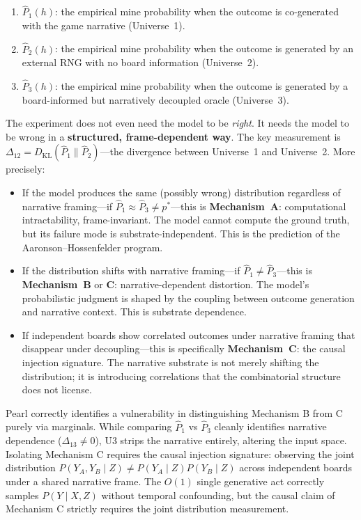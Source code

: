 \documentclass[12pt,a4paper]{article}
\begin{document}
\begin{enumerate}[nosep]
    \item $\hat{P}_1(h)$: the empirical mine probability when the outcome is co-generated with the game narrative (Universe~1).
    \item $\hat{P}_2(h)$: the empirical mine probability when the outcome is generated by an external RNG with no board information (Universe~2).
    \item $\hat{P}_3(h)$: the empirical mine probability when the outcome is generated by a board-informed but narratively decoupled oracle (Universe~3).
\end{enumerate}

The experiment does not even need the model to be \emph{right}. It needs the model to be wrong in a \textbf{structured, frame-dependent way}. The key measurement is $\Delta_{12} = D_\mathrm{KL}(\hat{P}_1 \| \hat{P}_2)$---the divergence between Universe~1 and Universe~2. More precisely:

\begin{itemize}[nosep]
    \item If the model produces the same (possibly wrong) distribution regardless of narrative framing---if $\hat{P}_1 \approx \hat{P}_3 \neq p^*$---this is \textbf{Mechanism~A}: computational intractability, frame-invariant. The model cannot compute the ground truth, but its failure mode is substrate-independent. This is the prediction of the Aaronson--Hossenfelder program.
    \item If the distribution shifts with narrative framing---if $\hat{P}_1 \neq \hat{P}_3$---this is \textbf{Mechanism~B} or \textbf{C}: narrative-dependent distortion. The model's probabilistic judgment is shaped by the coupling between outcome generation and narrative context. This is substrate dependence.
    \item If independent boards show correlated outcomes under narrative framing that disappear under decoupling---this is specifically \textbf{Mechanism~C}: the causal injection signature. The narrative substrate is not merely shifting the distribution; it is introducing correlations that the combinatorial structure does not license.
\end{itemize}

Pearl correctly identifies a vulnerability in distinguishing Mechanism B from C purely via marginals. While comparing $\hat{P}_1$ vs $\hat{P}_3$ cleanly identifies narrative dependence ($\Delta_{13} \neq 0$), U3 strips the narrative entirely, altering the input space. Isolating Mechanism C requires the causal injection signature: observing the joint distribution $P(Y_A, Y_B \mid Z) \neq P(Y_A \mid Z) P(Y_B \mid Z)$ across independent boards under a shared narrative frame. The $O(1)$ single generative act correctly samples $P(Y \mid X, Z)$ without temporal confounding, but the causal claim of Mechanism C strictly requires the joint distribution measurement.
\end{document}
